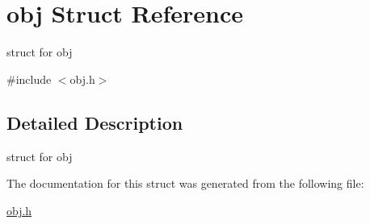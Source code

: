 \hypertarget{structobj}{}\section{obj Struct Reference}
\label{structobj}


struct for obj  




{\ttfamily \#include $<$obj.\+h$>$}



\subsection{Detailed Description}
struct for obj 

The documentation for this struct was generated from the following file\+:\begin{DoxyCompactItemize}
\item 
\hyperlink{obj_8h}{obj.\+h}\end{DoxyCompactItemize}
